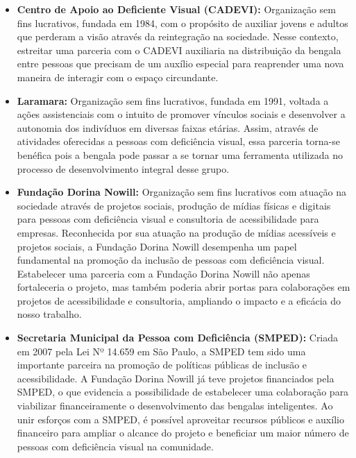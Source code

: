     
    \begin{itemize}
        \item \textbf{Centro de Apoio ao Deficiente Visual (CADEVI):} Organização sem fins lucrativos, fundada em 1984, com o propósito de auxiliar jovens e adultos que perderam a visão através da reintegração na sociedade. Nesse contexto, estreitar uma parceria com o CADEVI auxiliaria na distribuição da bengala entre pessoas que precisam de um auxílio especial para reaprender uma nova maneira de interagir com o espaço circundante.
        
        \item \textbf{Laramara:} Organização sem fins lucrativos, fundada em 1991, voltada a ações assistenciais com o intuito de promover vínculos sociais e desenvolver a autonomia dos indivíduos em diversas faixas etárias. Assim, através de atividades oferecidas a pessoas com deficiência visual, essa parceria torna-se benéfica pois a bengala pode passar a se tornar uma ferramenta utilizada no processo de desenvolvimento integral desse grupo.
        
        \item \textbf{Fundação Dorina Nowill:} Organização sem fins lucrativos com atuação na sociedade através de projetos sociais, produção de mídias físicas e digitais para pessoas com deficiência visual e consultoria de acessibilidade para empresas. Reconhecida por sua atuação na produção de mídias acessíveis e projetos sociais, a Fundação Dorina Nowill desempenha um papel fundamental na promoção da inclusão de pessoas com deficiência visual. Estabelecer uma parceria com a Fundação Dorina Nowill não apenas fortaleceria o projeto, mas também poderia abrir portas para colaborações em projetos de acessibilidade e consultoria, ampliando o impacto e a eficácia do nosso trabalho.
        
        \item \textbf{Secretaria Municipal da Pessoa com Deficiência (SMPED):} Criada em 2007 pela Lei Nº 14.659 em São Paulo, a SMPED tem sido uma importante parceira na promoção de políticas públicas de inclusão e acessibilidade. A Fundação Dorina Nowill já teve projetos financiados pela SMPED, o que evidencia a possibilidade de estabelecer uma colaboração para viabilizar financeiramente o desenvolvimento das bengalas inteligentes. Ao unir esforços com a SMPED, é possível aproveitar recursos públicos e auxílio financeiro para ampliar o alcance do projeto e beneficiar um maior número de pessoas com deficiência visual na comunidade.
    \end{itemize}


